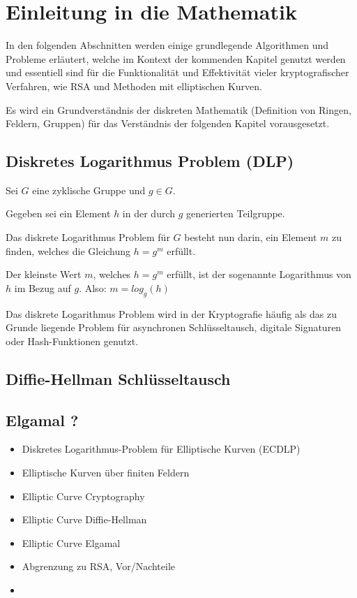\chapter{Einleitung in die Mathematik}

In den folgenden Abschnitten werden einige grundlegende Algorithmen und Probleme erläutert, welche im Kontext der kommenden 
Kapitel genutzt werden und essentiell sind für die Funktionalität und Effektivität vieler kryptografischer Verfahren, wie 
RSA und Methoden mit elliptischen Kurven.

Es wird ein Grundverständnis der diskreten Mathematik (Definition von Ringen, Feldern, Gruppen) für das Verständnis der folgenden
Kapitel vorausgesetzt.

\section{Diskretes Logarithmus Problem (DLP)}

Sei $ G $ eine zyklische Gruppe und $ g \in G $.

Gegeben sei ein Element $h$ in der durch $g$ generierten Teilgruppe.

Das diskrete Logarithmus Problem für $G$ besteht nun darin, ein Element $m$ zu finden, welches die Gleichung $ h = g^m $ erfüllt.

Der kleinste Wert $m$, welches $h = g^m$ erfüllt, ist der sogenannte Logarithmus von $h$ im Bezug auf $g$. Also: $m = log_g(h)$

Das diskrete Logarithmus Problem wird in der Kryptografie häufig als das zu Grunde liegende Problem für asynchronen Schlüsseltausch, digitale Signaturen oder Hash-Funktionen genutzt.

\section{Diffie-Hellman Schlüsseltausch}



\section{Elgamal ?}

\begin{itemize}
	\item Diskretes Logarithmus-Problem für Elliptische Kurven (ECDLP)
	\item Elliptische Kurven über finiten Feldern
	\item Elliptic Curve Cryptography
	\item Elliptic Curve Diffie-Hellman
	\item Elliptic Curve Elgamal
	\item Abgrenzung zu RSA, Vor/Nachteile
	\item 
\end{itemize}

\iffalse 

	Plot erstellen mit gnuplot:
	
	set view 0,0
	set isosample 500,500
	set contour base
	set cntrparam levels discrete 0
	unset surface
	set grid
	unset key
	unset ztics
	set xlabel 'x'
	set ylabel 'y'
	f(x,y) = x**3 + 3*x + 2 - y**2
	splot [-10:10][-10:10] f(x,y)

\fi